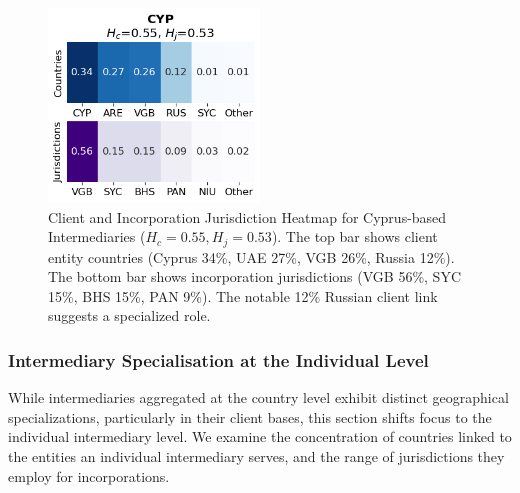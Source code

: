 \begin{figure}[htbp]
    \centering
    \includegraphics[width=0.5\textwidth]{images/Geography_Country_Heatmaps_Cyprus.png} %
    \caption{Client and Incorporation Jurisdiction Heatmap for Cyprus-based Intermediaries ($H_c=0.55, H_j=0.53$). The top bar shows client entity countries (Cyprus 34\%, UAE 27\%, VGB 26\%, Russia 12\%). The bottom bar shows incorporation jurisdictions (VGB 56\%, SYC 15\%, BHS 15\%, PAN 9\%). The notable 12\% Russian client link suggests a specialized role.}
    \label{fig:geography_country_heatmaps_cyprus}
\end{figure}

\subsubsection{Intermediary Specialisation at the Individual Level}
\label{subsubsec:network_countries_served} %

While intermediaries aggregated at the country level exhibit distinct geographical specializations, particularly in their client bases, this section shifts focus to the individual intermediary level. We examine the concentration of countries linked to the entities an individual intermediary serves, and the range of jurisdictions they employ for incorporations.

